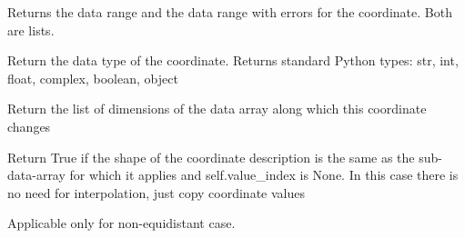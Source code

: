 \documentclass[letterpaper,10pt,english]{sphinxmanual}
\begin{document}
\begin{fulllineitems}
\begin{fulllineitems}
\label{\detokenize{coordinate:flap.coordinate.Coordinate.data_range}}
Returns the data range and the data range with errors for the coordinate. Both are lists.

\end{fulllineitems}


\begin{fulllineitems}
\label{\detokenize{coordinate:flap.coordinate.Coordinate.dtype}}
Return the data type of the coordinate.
Returns standard Python types: str, int, float, complex, boolean, object

\end{fulllineitems}


\begin{fulllineitems}
\label{\detokenize{coordinate:flap.coordinate.Coordinate.nochange_dimensions}}
Return the list of dimensions of the data array along which this coordinate
changes

\end{fulllineitems}


\begin{fulllineitems}
\label{\detokenize{coordinate:flap.coordinate.Coordinate.non_interpol}}
Return True if the shape of the coordinate description
is the same as the sub-data-array for which it applies and self.value\_index is None.
In this case there is no need for interpolation, just copy coordinate values

Applicable only for non-equidistant case.

\end{fulllineitems}


\end{fulllineitems}
\end{document}
